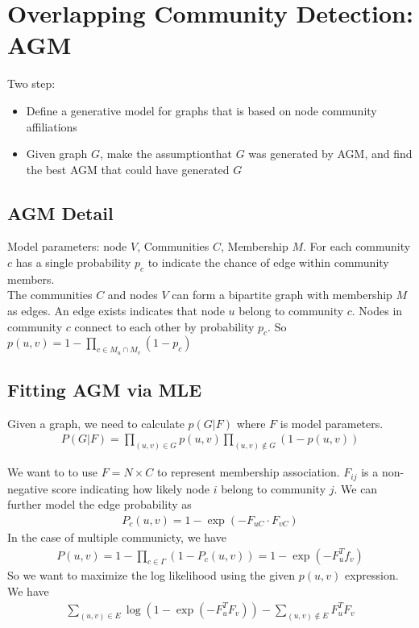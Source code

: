 \section{Overlapping Community Detection: AGM}
Two step: 
    \begin{itemize}
        \item Define a generative model for graphs that is based on node community affiliations
        \item Given graph $G$, make the assumptionthat $G$ was generated by AGM, and find the best AGM that could have generated $G$
    \end{itemize}

\subsection{AGM Detail} 
Model parameters: node $V$, Communities $C$, Membership $M$. For each community $c$ has a single probability $p_c$ to indicate the chance of edge within community members. \\
The communities $C$ and nodes $V$ can form a bipartite graph with membership $M$ as edges. An edge exists indicates that node $u$ belong to community $c$. Nodes in community $c$ connect to each other by probability $p_c$. So $p(u,v) = 1 - \prod_{c\in M_u \cap M_v}(1-p_c)$

\subsection{Fitting AGM via MLE} 
Given a graph, we need to calculate $p(G|F)$ where $F$ is model parameters. 
    \begin{align*}
        P(G|F) = \prod_{(u,v)\in G} p(u,v) \prod_{(u,v) \notin G}(1 - p(u,v))
    \end{align*}

We want to to use $F = N \times C$ to represent membership association. $F_{ij}$ is a non-negative score indicating how likely node $i$ belong to community $j$. We can further model the edge probability as 
    \begin{align*}
        P_c(u,v) = 1 - \exp(-F_{uC} \cdot F_{vC})
    \end{align*}
In the case of multiple communicty, we have 
    \begin{align*}
        P(u,v) = 1 - \prod_{c\in \Gamma}(1-P_c(u,v)) = 1 - \exp(-F_u^Tf_v)
    \end{align*}
So we want to maximize the log likelihood using the given $p(u,v)$ expression. We have 
    \begin{align*}
        \sum_{(u,v)\in E} \log(1 - \exp(-F_u^TF_v)) - \sum_{(u,v)\notin E}F_u^TF_v
    \end{align*}

